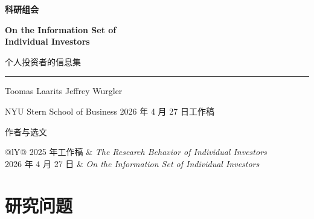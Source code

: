 \begin{frame}[plain]
  \vfill
  {\small\color{wine}\bfseries 科研组会\par}
  \vspace{5mm}
  {\fontsize{22}{26}\selectfont\bfseries On the Information Set of\\Individual Investors\par}
  \vspace{3mm}
  {\large\color{wine}个人投资者的信息集\par}
  \vspace{3mm}
  {\color{wine}\rule{.95\linewidth}{.75pt}}\par\medskip
  Toomas Laarits \quad Jeffrey Wurgler\par
  {\small NYU Stern School of Business \hfill 2026 年 4 月 27 日工作稿}\vfill
\end{frame}

\begin{frame}[label=authors]{作者与选文}
  \medskip
  \medskip
  \begin{tabularx}{\linewidth}{@{}lY@{}}
    2025 年工作稿 & \textit{The Research Behavior of Individual Investors}\\
    2026 年 4 月 27 日 & \textit{On the Information Set of Individual Investors}
  \end{tabularx}
\end{frame}

\section{研究问题}

